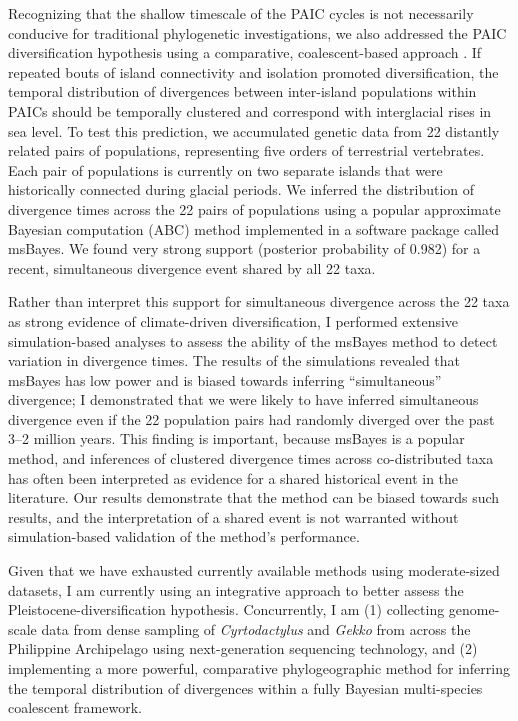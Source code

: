 \documentclass[10pt]{article}
\begin{document}
Recognizing that the shallow timescale of the PAIC cycles is not necessarily conducive for traditional phylogenetic investigations, we also addressed the PAIC diversification hypothesis using a comparative, coalescent-based approach .
If repeated bouts of island connectivity and isolation promoted diversification, the temporal distribution of divergences between inter-island populations within PAICs should be temporally clustered and correspond with interglacial rises in sea level.
To test this prediction, we accumulated genetic data from 22 distantly related pairs of populations, representing five orders of terrestrial vertebrates.
Each pair of populations is currently on two separate islands that were historically connected during glacial periods.
We inferred the distribution of divergence times across the 22 pairs of populations using a popular approximate Bayesian computation (ABC) method implemented in a software package called msBayes.
We found very strong support (posterior probability of 0.982) for a recent, simultaneous divergence event shared by all 22 taxa.

Rather than interpret this support for simultaneous divergence across the 22 taxa as strong evidence of climate-driven diversification, I performed extensive simulation-based analyses to assess the ability of the msBayes method to detect variation in divergence times.
The results of the simulations revealed that msBayes has low power and is biased towards inferring ``simultaneous'' divergence; I demonstrated that we were likely to have inferred simultaneous divergence even if the 22 population pairs had randomly diverged over the past 3--2 million years.
This finding is important, because msBayes is a popular method, and inferences of clustered divergence times across co-distributed taxa has often been interpreted as evidence for a shared historical event in the literature.
Our results demonstrate that the method can be biased towards such results, and the interpretation of a shared event is not warranted without simulation-based validation of the method's performance.

Given that we have exhausted currently available methods using moderate-sized datasets, I am currently using an integrative approach to better assess the Pleistocene-diversification hypothesis.  Concurrently, I am (1) collecting genome-scale data from dense sampling of \emph{Cyrtodactylus} and \emph{Gekko} from across the Philippine Archipelago using next-generation sequencing technology, and (2) implementing a more powerful, comparative phylogeographic method for inferring the temporal distribution of divergences within a fully Bayesian multi-species coalescent framework.
\end{document}
